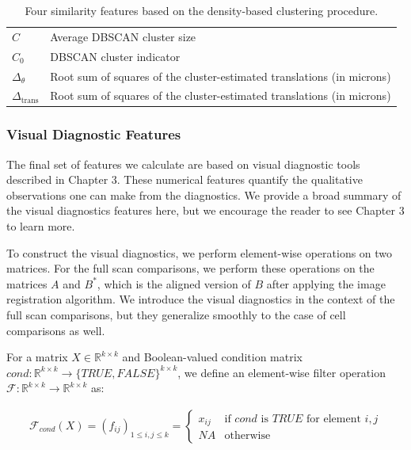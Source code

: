 \documentclass[11pt,]{isuthesis}
\begin{document}
\begin{table}

\caption{\label{tab:dbscanFeatures-latex}Four similarity features based on the density-based clustering procedure.}
\centering
\begin{tabu} to 
\toprule
$C$ & Average DBSCAN cluster size\\
$C_0$ & DBSCAN cluster indicator\\
$\Delta_{\theta}$ & Root sum of squares of the cluster-estimated translations (in microns)\\
$\Delta_{\text{trans}}$ & Root sum of squares of the cluster-estimated translations (in microns)\\
\bottomrule
\end{tabu}
\end{table}

\hypertarget{visual-diagnostic-features}{%
\subsubsection{Visual Diagnostic Features}\label{visual-diagnostic-features}}

The final set of features we calculate are based on visual diagnostic tools described in Chapter 3.
These numerical features quantify the qualitative observations one can make from the diagnostics.
We provide a broad summary of the visual diagnostics features here, but we encourage the reader to see Chapter 3 to learn more.

To construct the visual diagnostics, we perform element-wise operations on two matrices.
For the full scan comparisons, we perform these operations on the matrices \(A\) and \(B^*\), which is the aligned version of \(B\) after applying the image registration algorithm.
We introduce the visual diagnostics in the context of the full scan comparisons, but they generalize smoothly to the case of cell comparisons as well.

For a matrix \(X \in \mathbb{R}^{k \times k}\) and Boolean-valued condition matrix \(cond: \mathbb{R}^{k \times k} \to \{TRUE,FALSE\}^{k \times k}\), we define an element-wise filter operation \(\mathcal{F}: \mathbb{R}^{k \times k} \to \mathbb{R}^{k \times k}\) as:

\begin{align*}
\mathcal{F}_{cond}(X) = 
(f_{ij})_{1 \leq i,j \leq k} =
\begin{cases}
x_{ij} &\text{if $cond$ is $TRUE$ for element $i,j$} \\
NA &\text{otherwise}
\end{cases}
\end{align*}
\end{document}
